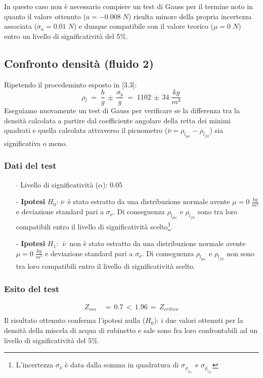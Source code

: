 \documentclass{article}
\begin{document}
In  questo caso non è necessario compiere un test di Gauss per il termine noto in quanto il valore ottenuto ($a = -0.008\;N$) risulta minore della propria incertezza associata ($\sigma_{a} = 0.01\;N$) e dunque compatibile con il valore teorico ($\mu = 0\;N$) entro un livello di significatività del 5\%.

\subsection{Confronto densità (fluido 2)}
Ripetendo il procedeminto esposto in [3.3]:
\begin{equation*}
    \rho_l \; = \;\frac{b}{g} \,\pm \,\frac{\sigma_b}{g}\;=\; 1102 \,\pm \,34 \; \frac{kg}{m^3}
\end{equation*}
Eseguiamo nuovamente un test di Gauss per verificare se la differenza tra la densità calcolata a partire dal coefficiente angolare della retta dei minimi quadrati e quella calcolata attraverso il picnometro ($\bar{\nu} = \rho_{l_{pic}} - \rho_{l_{fit}}$) sia significativa o meno.
\subsubsection{Dati del test}
\begin{itemize}
    \item [$\cdot$] Livello di significatività ($\alpha$): 0.05
    \item [-] \textbf{Ipotesi} $H_0$: $\bar{\nu}\,$ è stato estratto da una distribuzione normale avente $\mu = 0\;\frac{kg}{m^3}$ e deviazione standard pari a $\sigma_{\bar{\nu}}$. Di conseguenza $\rho_{l_{pic}}$ e $\rho_{l_{fit}}$ sono tra loro compatibili entro il livello di significatività scelto\footnote{L'incertezza $\sigma_{\bar{\nu}}$ è data dalla somma in quadratura di $\sigma_{\rho_{l_{pic}}}$ e $\sigma_{\rho_{l_{fit}}}$}.
    \item [-] \textbf{Ipotesi} $H_1$: $\;\bar{\nu}\,$ non è stato estratto da una distribuzione normale avente $\mu = 0\;\frac{kg}{m^3}$ e deviazione standard pari a $\sigma_{\bar{\nu}}$. Di conseguenza $\rho_{l_{pic}}$ e $\rho_{l_{fit}}$ non sono tra loro compatibili entro il livello di significatività scelto.
\end{itemize}
\subsubsection{Esito del test}
\begin{equation*}
\begin{split}
    Z_{oss} \,&= \,0.7 \,< \,1.96 \,= \,Z_{critico} \\[0.2cm]
\end{split}
\end{equation*}
Il risultato ottenuto conferma l'ipotesi nulla ($H_0$): i due valori ottenuti per la densità della miscela di acqua di rubinetto e sale sono fra loro confrontabili ad un livello di significatività del 5\%.
\end{document}
